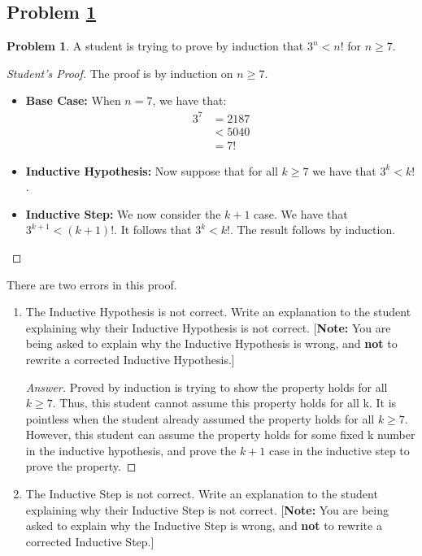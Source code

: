 \documentclass[11pt]{article}
\theoremstyle{definition}
\theoremstyle{definition}
\newtheorem{required}{Problem}
\theoremstyle{definition}
\begin{document}
\subsection{Problem \ref{Induction1}}
\begin{required} \label{Induction1}
A student is trying to prove by induction that $3^{n} < n!$ for $n \geq 7$. 

\begin{proof}[Student's Proof]
The proof is by induction on $n \geq 7$. 
\begin{itemize}
\item \textbf{Base Case:} When $n = 7$, we have that:
\begin{align*}
3^{7} &= 2187 \\
&< 5040 \\
&= 7!
\end{align*}

\item \textbf{Inductive Hypothesis:} Now suppose that for all $k \geq 7$ we have that $3^{k} < k!$. 

\item \textbf{Inductive Step:} We now consider the $k+1$ case. We have that $3^{k+1} < (k+1)!$. It follows that $3^{k} < k!$. The result follows by induction.
\end{itemize}
\end{proof}

There are two errors in this proof. 
\begin{enumerate}[label=(\alph*)]
\item The Inductive Hypothesis is not correct. Write an explanation to the student explaining why their Inductive Hypothesis is not correct.  [\textbf{Note:} You are being asked to explain why the Inductive Hypothesis is wrong, and \textbf{not} to rewrite a corrected Inductive Hypothesis.]


\begin{proof}[Answer]
Proved by induction is trying to show the property holds for all $k \geq 7$. Thus, this student cannot assume this property holds for all k. It is pointless when the student already assumed the property holds for all $k \geq 7$. However, this student can assume the property holds for some fixed k number in the inductive hypothesis, and prove the $k+1$ case in the inductive step to prove the property. 
\end{proof}



\vskip 15pt
\item The Inductive Step is not correct. Write an explanation to the student explaining why their Inductive Step is not correct. [\textbf{Note:} You are being asked to explain why the Inductive Step is wrong, and \textbf{not} to rewrite a corrected Inductive Step.]


\end{enumerate}
\end{required}
\end{document}
